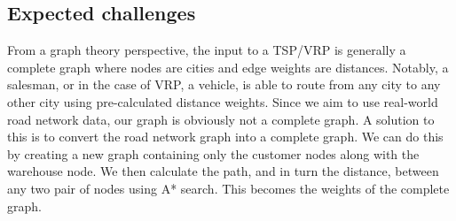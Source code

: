 \documentclass[conference]{IEEEtran}
\begin{document}



\subsection{Expected challenges}

From a graph theory perspective, the input to a TSP/VRP is generally a complete graph where nodes are cities and edge weights are distances. Notably, a salesman, or in the case of VRP, a vehicle, is able to route from any city to any other city using pre-calculated distance weights. Since we aim to use real-world road network data, our graph is obviously not a complete graph. A solution to this is to convert the road network graph into a complete graph. We can do this by creating a new graph containing only the customer nodes along with the warehouse node. We then calculate the path, and in turn the distance, between any two pair of nodes using A* search. This becomes the weights of the complete graph.

\end{document}
